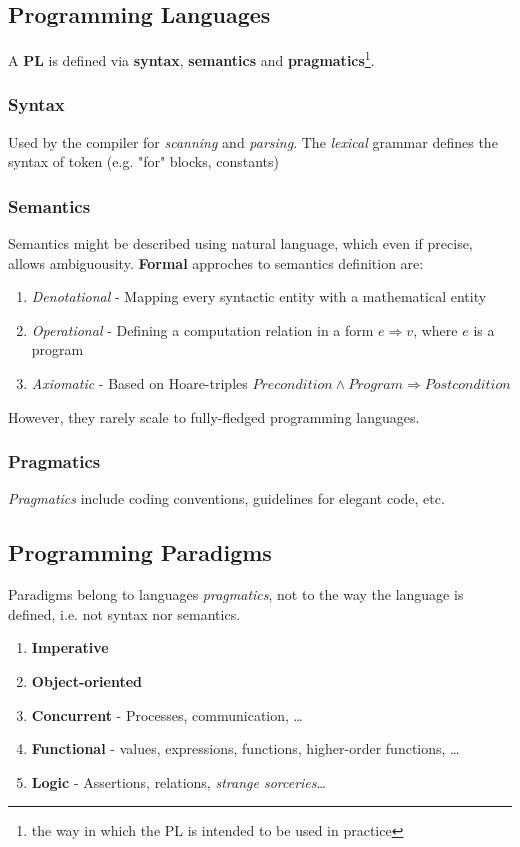\subsection{Programming Languages}
A \textbf{PL} is defined via \textbf{syntax}, \textbf{semantics} and \textbf{pragmatics}\footnote{the way in which the PL is intended to be used in practice}.
\subsubsection{Syntax}
Used by the compiler for \textit{scanning} and \textit{parsing}.
The \textit{lexical} grammar defines the syntax of token (e.g. "for" blocks, constants)
\subsubsection{Semantics}
Semantics might be described using natural language, which even if precise, allows ambiguousity.
\textbf{Formal} approches to semantics definition are:
\begin{enumerate}
    \item \textit{Denotational} - Mapping every syntactic entity with a mathematical entity
    \item \textit{Operational} - Defining a computation relation in a form $e \Rightarrow v$, where $e$ is a program
    \item \textit{Axiomatic} - Based on Hoare-triples $\textit{Precondition} \wedge \textit{Program}\Rightarrow \textit{Postcondition}$ 
\end{enumerate}
However, they rarely scale to fully-fledged programming languages.
\subsubsection{Pragmatics}
\textit{Pragmatics} include coding conventions, guidelines for elegant code, etc.

\subsection{Programming Paradigms}
Paradigms belong to languages \textit{pragmatics}, not to the way the language is defined, i.e. not syntax nor semantics.
\begin{enumerate}
    \item \textbf{Imperative}
    \item \textbf{Object-oriented}
    \item \textbf{Concurrent} - Processes, communication, \dots 
    \item \textbf{Functional} - values, expressions,
    functions, higher-order functions, \dots
    \item \textbf{Logic} - Assertions, relations, \textit{strange sorceries}\dots 
\end{enumerate}

